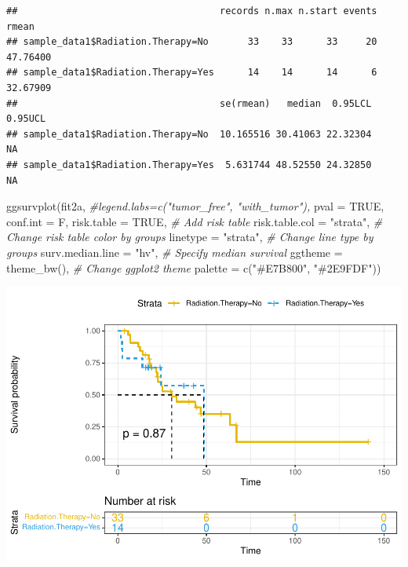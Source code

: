 \documentclass[
  11pt,
]{article}
\newenvironment{Shaded}{\begin{snugshade}}{\end{snugshade}}
\newcommand{\AttributeTok}[1]{\textcolor[rgb]{0.77,0.63,0.00}{#1}}
\newcommand{\CommentTok}[1]{\textcolor[rgb]{0.56,0.35,0.01}{\textit{#1}}}
\newcommand{\ConstantTok}[1]{\textcolor[rgb]{0.00,0.00,0.00}{#1}}
\newcommand{\FunctionTok}[1]{\textcolor[rgb]{0.00,0.00,0.00}{#1}}
\newcommand{\NormalTok}[1]{#1}
\newcommand{\SpecialCharTok}[1]{\textcolor[rgb]{0.00,0.00,0.00}{#1}}
\newcommand{\StringTok}[1]{\textcolor[rgb]{0.31,0.60,0.02}{#1}}
\begin{document}
\begin{Shaded}
\end{Shaded}

\begin{verbatim}
##                                    records n.max n.start events    rmean
## sample_data1$Radiation.Therapy=No       33    33      33     20 47.76400
## sample_data1$Radiation.Therapy=Yes      14    14      14      6 32.67909
##                                    se(rmean)   median  0.95LCL 0.95UCL
## sample_data1$Radiation.Therapy=No  10.165516 30.41063 22.32304      NA
## sample_data1$Radiation.Therapy=Yes  5.631744 48.52550 24.32850      NA
\end{verbatim}

\begin{Shaded}
\begin{Highlighting}[]
\FunctionTok{ggsurvplot}\NormalTok{(fit2a,}
          \CommentTok{\#legend.labs=c("tumor\_free", "with\_tumor"),}
          \AttributeTok{pval =} \ConstantTok{TRUE}\NormalTok{, }\AttributeTok{conf.int =}\NormalTok{ F,}
          \AttributeTok{risk.table =} \ConstantTok{TRUE}\NormalTok{, }\CommentTok{\# Add risk table}
          \AttributeTok{risk.table.col =} \StringTok{"strata"}\NormalTok{, }\CommentTok{\# Change risk table color by groups}
          \AttributeTok{linetype =} \StringTok{"strata"}\NormalTok{, }\CommentTok{\# Change line type by groups}
          \AttributeTok{surv.median.line =} \StringTok{"hv"}\NormalTok{, }\CommentTok{\# Specify median survival}
          \AttributeTok{ggtheme =} \FunctionTok{theme\_bw}\NormalTok{(), }\CommentTok{\# Change ggplot2 theme}
          \AttributeTok{palette =} \FunctionTok{c}\NormalTok{(}\StringTok{"\#E7B800"}\NormalTok{, }\StringTok{"\#2E9FDF"}\NormalTok{))}
\end{Highlighting}
\end{Shaded}

\includegraphics{Random_new_surv_4_files/figure-latex/unnamed-chunk-7-1.pdf}
\end{document}
